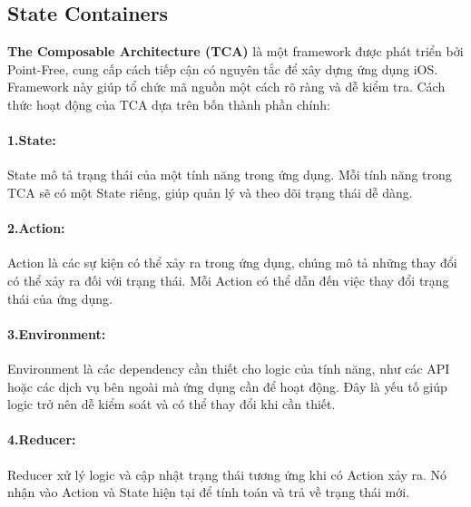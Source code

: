 \subsection{State Containers}

\hspace*{0.8cm}\textbf{The Composable Architecture (TCA)} là một framework được phát triển bởi Point-Free, cung cấp cách tiếp cận có nguyên tắc để xây dựng ứng dụng iOS. Framework này giúp tổ chức mã nguồn một cách rõ ràng và dễ kiểm tra.
Cách thức hoạt động của TCA dựa trên bốn thành phần chính:
\paragraph*{1.State:}State mô tả trạng thái của một tính năng trong ứng dụng. Mỗi tính năng trong TCA sẽ có một State riêng, giúp quản lý và theo dõi trạng thái dễ dàng.
\paragraph*{2.Action:}Action là các sự kiện có thể xảy ra trong ứng dụng, chúng mô tả những thay đổi có thể xảy ra đối với trạng thái. Mỗi Action có thể dẫn đến việc thay đổi trạng thái của ứng dụng.
\paragraph*{3.Environment:}Environment là các dependency cần thiết cho logic của tính năng, như các API hoặc các dịch vụ bên ngoài mà ứng dụng cần để hoạt động. Đây là yếu tố giúp logic trở nên dễ kiểm soát và có thể thay đổi khi cần thiết.
\paragraph*{4.Reducer:}Reducer xử lý logic và cập nhật trạng thái tương ứng khi có Action xảy ra. Nó nhận vào Action và State hiện tại để tính toán và trả về trạng thái mới.

